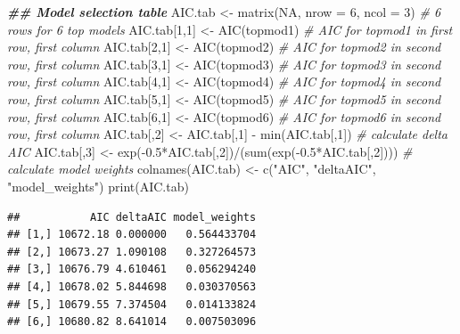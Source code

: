 \documentclass[
]{article}
\newenvironment{Shaded}{\begin{snugshade}}{\end{snugshade}}
\newcommand{\AttributeTok}[1]{\textcolor[rgb]{0.77,0.63,0.00}{#1}}
\newcommand{\CommentTok}[1]{\textcolor[rgb]{0.56,0.35,0.01}{\textit{#1}}}
\newcommand{\ConstantTok}[1]{\textcolor[rgb]{0.00,0.00,0.00}{#1}}
\newcommand{\DecValTok}[1]{\textcolor[rgb]{0.00,0.00,0.81}{#1}}
\newcommand{\DocumentationTok}[1]{\textcolor[rgb]{0.56,0.35,0.01}{\textbf{\textit{#1}}}}
\newcommand{\FloatTok}[1]{\textcolor[rgb]{0.00,0.00,0.81}{#1}}
\newcommand{\FunctionTok}[1]{\textcolor[rgb]{0.00,0.00,0.00}{#1}}
\newcommand{\NormalTok}[1]{#1}
\newcommand{\OtherTok}[1]{\textcolor[rgb]{0.56,0.35,0.01}{#1}}
\newcommand{\SpecialCharTok}[1]{\textcolor[rgb]{0.00,0.00,0.00}{#1}}
\newcommand{\StringTok}[1]{\textcolor[rgb]{0.31,0.60,0.02}{#1}}
\begin{document}
\begin{Shaded}
\begin{Highlighting}[]
\DocumentationTok{\#\# Model selection table}
\NormalTok{AIC.tab }\OtherTok{\textless{}{-}} \FunctionTok{matrix}\NormalTok{(}\ConstantTok{NA}\NormalTok{, }\AttributeTok{nrow =} \DecValTok{6}\NormalTok{, }\AttributeTok{ncol =} \DecValTok{3}\NormalTok{) }\CommentTok{\# 6 rows for 6 top models}
\NormalTok{AIC.tab[}\DecValTok{1}\NormalTok{,}\DecValTok{1}\NormalTok{] }\OtherTok{\textless{}{-}} \FunctionTok{AIC}\NormalTok{(topmod1) }\CommentTok{\# AIC for topmod1 in first row, first column}
\NormalTok{AIC.tab[}\DecValTok{2}\NormalTok{,}\DecValTok{1}\NormalTok{] }\OtherTok{\textless{}{-}} \FunctionTok{AIC}\NormalTok{(topmod2) }\CommentTok{\# AIC for topmod2 in second row, first column}
\NormalTok{AIC.tab[}\DecValTok{3}\NormalTok{,}\DecValTok{1}\NormalTok{] }\OtherTok{\textless{}{-}} \FunctionTok{AIC}\NormalTok{(topmod3) }\CommentTok{\# AIC for topmod3 in second row, first column}
\NormalTok{AIC.tab[}\DecValTok{4}\NormalTok{,}\DecValTok{1}\NormalTok{] }\OtherTok{\textless{}{-}} \FunctionTok{AIC}\NormalTok{(topmod4) }\CommentTok{\# AIC for topmod4 in second row, first column}
\NormalTok{AIC.tab[}\DecValTok{5}\NormalTok{,}\DecValTok{1}\NormalTok{] }\OtherTok{\textless{}{-}} \FunctionTok{AIC}\NormalTok{(topmod5) }\CommentTok{\# AIC for topmod5 in second row, first column}
\NormalTok{AIC.tab[}\DecValTok{6}\NormalTok{,}\DecValTok{1}\NormalTok{] }\OtherTok{\textless{}{-}} \FunctionTok{AIC}\NormalTok{(topmod6) }\CommentTok{\# AIC for topmod6 in second row, first column}
\NormalTok{AIC.tab[,}\DecValTok{2}\NormalTok{] }\OtherTok{\textless{}{-}}\NormalTok{ AIC.tab[,}\DecValTok{1}\NormalTok{] }\SpecialCharTok{{-}} \FunctionTok{min}\NormalTok{(AIC.tab[,}\DecValTok{1}\NormalTok{]) }\CommentTok{\# calculate delta AIC}
\NormalTok{AIC.tab[,}\DecValTok{3}\NormalTok{] }\OtherTok{\textless{}{-}} \FunctionTok{exp}\NormalTok{(}\SpecialCharTok{{-}}\FloatTok{0.5}\SpecialCharTok{*}\NormalTok{AIC.tab[,}\DecValTok{2}\NormalTok{])}\SpecialCharTok{/}\NormalTok{(}\FunctionTok{sum}\NormalTok{(}\FunctionTok{exp}\NormalTok{(}\SpecialCharTok{{-}}\FloatTok{0.5}\SpecialCharTok{*}\NormalTok{AIC.tab[,}\DecValTok{2}\NormalTok{]))) }\CommentTok{\# calculate model weights}
\FunctionTok{colnames}\NormalTok{(AIC.tab) }\OtherTok{\textless{}{-}} \FunctionTok{c}\NormalTok{(}\StringTok{"AIC"}\NormalTok{, }\StringTok{"deltaAIC"}\NormalTok{, }\StringTok{"model\_weights"}\NormalTok{)}
\FunctionTok{print}\NormalTok{(AIC.tab)}
\end{Highlighting}
\end{Shaded}

\begin{verbatim}
##           AIC deltaAIC model_weights
## [1,] 10672.18 0.000000   0.564433704
## [2,] 10673.27 1.090108   0.327264573
## [3,] 10676.79 4.610461   0.056294240
## [4,] 10678.02 5.844698   0.030370563
## [5,] 10679.55 7.374504   0.014133824
## [6,] 10680.82 8.641014   0.007503096
\end{verbatim}
\end{document}
